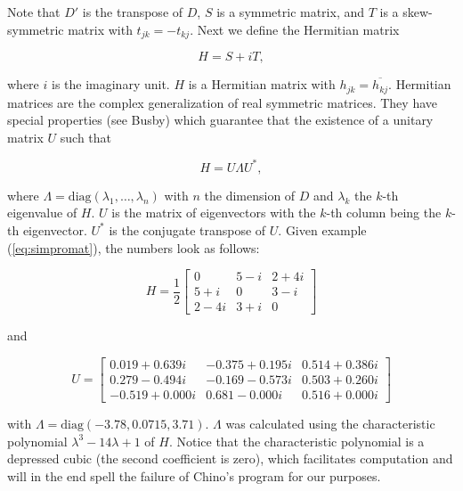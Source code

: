 \documentclass[11pt]{article}
\begin{document}
Note that $D'$ is the transpose of $D$, $S$ is a symmetric matrix, and
$T$ is a skew-symmetric matrix with $t_{jk}=-t_{kj}$. Next we define
the Hermitian matrix

\begin{equation}
  \label{eq:herm}
  H=S+iT,
\end{equation}

where $i$ is the imaginary unit. $H$ is a Hermitian matrix with
$h_{jk}=\overline{h_{kj}}$. Hermitian matrices are the complex
generalization of real symmetric matrices. They have special
properties (see Busby) which guarantee that the existence of
a unitary matrix $U$ such that 

\begin{equation}
  \label{eq:unitary}
  H=U\Lambda{}U^{*},
\end{equation}

where $\Lambda=\mbox{diag}(\lambda_{1},\ldots,\lambda_{n})$ with $n$
the dimension of $D$ and $\lambda_{k}$ the $k$-th eigenvalue of $H$.
$U$ is the matrix of eigenvectors with the $k$-th column being the
$k$-th eigenvector. $U^{*}$ is the conjugate transpose of $U$. Given
example (\ref{eq:simpromat}), the numbers look as follows:

\begin{equation}
  \label{eq:simh}
H=\frac{1}{2}\left[
      \begin{array}{ccc}
        0 & 5-i & 2+4i \\
        5+i & 0 & 3-i \\
        2-4i & 3+i & 0 
      \end{array}
\right]
\end{equation}

and

\begin{equation}
  \label{eq:simu}
U=\left[
      \begin{array}{ccc}
   0.019 + 0.639i & -0.375 + 0.195i &  0.514 + 0.386i \\
   0.279 - 0.494i & -0.169 - 0.573i &  0.503 + 0.260i \\
  -0.519 + 0.000i &  0.681 - 0.000i &  0.516 + 0.000i
      \end{array}
\right]
\end{equation}

with $\Lambda=\mbox{diag}(-3.78,0.0715,3.71)$. $\Lambda$ was
calculated using the characteristic polynomial
$\lambda^{3}-14\lambda+1$ of $H$. Notice that the characteristic
polynomial is a depressed cubic (the second coefficient is zero),
which facilitates computation and will in the end spell the failure of
Chino's program for our purposes.
\end{document}
